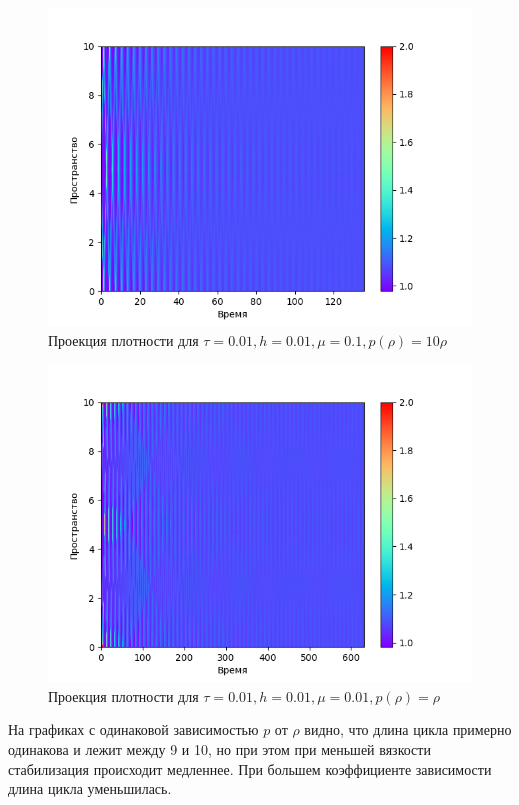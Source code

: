 \begin{center}
\begin{figure}[H]
    \centering
    \includegraphics[height=0.4\textheight]{pics/task2/h-2-2-12_1.png}
    \caption{Проекция плотности для $\tau = 0.01, h = 0.01, \mu = 0.1, p(\rho) = 10\rho$}
\end{figure}

\begin{figure}[H]
    \centering
    \includegraphics[height=0.4\textheight]{pics/task2/h-2-2-21_1.png}
    \caption{Проекция плотности для $\tau = 0.01, h = 0.01, \mu = 0.01, p(\rho) = \rho$}
\end{figure}
\end{center}

На графиках с одинаковой зависимостью $p$ от $\rho$ видно, что длина цикла примерно одинакова и лежит между 9 и 10, но при этом при меньшей вязкости стабилизация происходит медленнее. При большем коэффициенте зависимости длина цикла уменьшилась.

